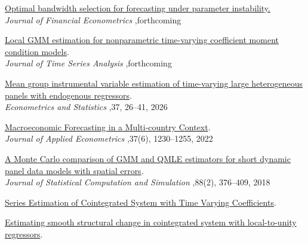 \documentclass[letterpaper,10pt]{article}
\begin{document}
\begin{etaremune}
  \item  \href{https://doi.org/10.1093/jjfinec/nbag001}
         {Optimal bandwidth selection for forecasting under parameter instability.} \\
         \textit{Journal of Financial Econometrics} \sep forthcoming
  
  \item \href{https://onlinelibrary.wiley.com/doi/10.1111/jtsa.12822}
        {Local GMM estimation for nonparametric time-varying coefficient moment condition models}.\\
        \textit{Journal of Time Series Analysis} \sep forthcoming

  \item \href{https://www.sciencedirect.com/science/article/pii/S2452306223000412}
        {Mean group instrumental variable estimation of time-varying large heterogeneous panels with endogenous regressors}. \\
        \textit{Econometrics and Statistics} \sep 37, 26–41, 2026

  \item \href{https://onlinelibrary.wiley.com/doi/abs/10.1002/jae.2923}
        {Macroeconomic Forecasting in a Multi-country Context}. \\
        \textit{Journal of Applied Econometrics} \sep 37(6), 1230--1255, 2022

  \item \href{https://www.tandfonline.com/doi/abs/10.1080/00949655.2017.1392522}
        {A Monte Carlo comparison of GMM and QMLE estimators for short dynamic panel data models with spatial errors}. \\
        \textit{Journal of Statistical Computation and Simulation} \sep 88(2), 376--409, 2018
\end{etaremune}


\begin{etaremune}
 \item  \href{https://github.com/jdluxun1/jdluxun1.github.io/blob/main/content/papers/article.pdf}{Series Estimation of Cointegrated System with Time Varying Coefficients}.   
 
 \item \href{https://github.com/jdluxun1/jdluxun1.github.io/blob/main/content/papers/Binder1.pdf}{Estimating smooth structural change in cointegrated system with local-to-unity regressors}.  
\end{etaremune}
\end{document}
